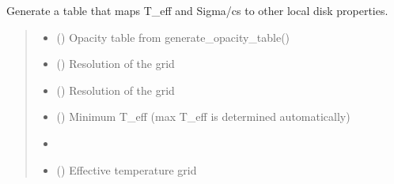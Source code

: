 \documentclass[a4paper,11pt,english]{sphinxmanual}
\begin{document}

\begin{fulllineitems}
\label{\detokenize{x22:disk_model.generate_disk_property_table}}
\pysigstartsignatures
\pysiglinewithargsret
{}
{\sphinxparamcomma {}\sphinxparamcomma {}\sphinxparamcomma {}}
{}
\pysigstopsignatures
\sphinxAtStartPar
Generate a table that maps T\_eff and Sigma/cs to other local disk
properties.
\begin{quote}\begin{description}
\begin{itemize}
\item {} 
\sphinxAtStartPar
{} () \textendash{} Opacity table from generate\_opacity\_table()

\item {} 
\sphinxAtStartPar
{} () \textendash{} Resolution of the grid

\item {} 
\sphinxAtStartPar
{} () \textendash{} Resolution of the grid

\item {} 
\sphinxAtStartPar
{} () \textendash{} Minimum T\_eff (max T\_eff is determined automatically)

\end{itemize}

\sphinxAtStartPar
\begin{itemize}
\item {} 
\sphinxAtStartPar
{}

\item {} 
\sphinxAtStartPar
{} () \textendash{} Effective temperature grid


\end{itemize}
\end{description}
\end{quote}
\end{fulllineitems}
\end{document}
